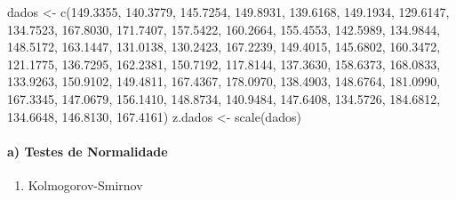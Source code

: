 \documentclass[
  letterpaper,
  DIV=11,
  numbers=noendperiod]{scrartcl}
\let\oldparagraph\paragraph
\renewcommand{\paragraph}[1]{\oldparagraph{#1}\mbox{}}
\newenvironment{Shaded}{\begin{snugshade}}{\end{snugshade}}
\newcommand{\FloatTok}[1]{\textcolor[rgb]{0.68,0.00,0.00}{#1}}
\newcommand{\FunctionTok}[1]{\textcolor[rgb]{0.28,0.35,0.67}{#1}}
\newcommand{\NormalTok}[1]{\textcolor[rgb]{0.00,0.23,0.31}{#1}}
\newcommand{\OtherTok}[1]{\textcolor[rgb]{0.00,0.23,0.31}{#1}}
\providecommand{\tightlist}{%
  \setlength{\itemsep}{0pt}\setlength{\parskip}{0pt}}\usepackage{longtable,booktabs,array}
\begin{document}
\begin{Shaded}
\begin{Highlighting}[]
\NormalTok{dados }\OtherTok{\textless{}{-}} \FunctionTok{c}\NormalTok{(}\FloatTok{149.3355}\NormalTok{, }\FloatTok{140.3779}\NormalTok{, }\FloatTok{145.7254}\NormalTok{, }\FloatTok{149.8931}\NormalTok{, }\FloatTok{139.6168}\NormalTok{, }\FloatTok{149.1934}\NormalTok{, }\FloatTok{129.6147}\NormalTok{, }\FloatTok{134.7523}\NormalTok{, }\FloatTok{167.8030}\NormalTok{, }\FloatTok{171.7407}\NormalTok{, }\FloatTok{157.5422}\NormalTok{, }\FloatTok{160.2664}\NormalTok{, }\FloatTok{155.4553}\NormalTok{, }\FloatTok{142.5989}\NormalTok{, }\FloatTok{134.9844}\NormalTok{, }\FloatTok{148.5172}\NormalTok{, }\FloatTok{163.1447}\NormalTok{, }\FloatTok{131.0138}\NormalTok{, }\FloatTok{130.2423}\NormalTok{, }\FloatTok{167.2239}\NormalTok{, }\FloatTok{149.4015}\NormalTok{, }\FloatTok{145.6802}\NormalTok{, }\FloatTok{160.3472}\NormalTok{, }\FloatTok{121.1775}\NormalTok{, }\FloatTok{136.7295}\NormalTok{, }\FloatTok{162.2381}\NormalTok{, }\FloatTok{150.7192}\NormalTok{, }\FloatTok{117.8144}\NormalTok{, }\FloatTok{137.3630}\NormalTok{, }\FloatTok{158.6373}\NormalTok{, }\FloatTok{168.0833}\NormalTok{, }\FloatTok{133.9263}\NormalTok{, }\FloatTok{150.9102}\NormalTok{, }\FloatTok{149.4811}\NormalTok{, }\FloatTok{167.4367}\NormalTok{, }\FloatTok{178.0970}\NormalTok{, }\FloatTok{138.4903}\NormalTok{, }\FloatTok{148.6764}\NormalTok{, }\FloatTok{181.0990}\NormalTok{, }\FloatTok{167.3345}\NormalTok{, }\FloatTok{147.0679}\NormalTok{, }\FloatTok{156.1410}\NormalTok{, }\FloatTok{148.8734}\NormalTok{, }\FloatTok{140.9484}\NormalTok{, }\FloatTok{147.6408}\NormalTok{, }\FloatTok{134.5726}\NormalTok{, }\FloatTok{184.6812}\NormalTok{, }\FloatTok{134.6648}\NormalTok{, }\FloatTok{146.8130}\NormalTok{, }\FloatTok{167.4161}\NormalTok{)}
\NormalTok{z.dados }\OtherTok{\textless{}{-}} \FunctionTok{scale}\NormalTok{(dados)}
\end{Highlighting}
\end{Shaded}

\hypertarget{a-testes-de-normalidade}{%
\paragraph{a) Testes de Normalidade}\label{a-testes-de-normalidade}}

\begin{enumerate}
\def\labelenumi{\roman{enumi})}
\tightlist
\item
  Kolmogorov-Smirnov
\end{enumerate}
\end{document}
